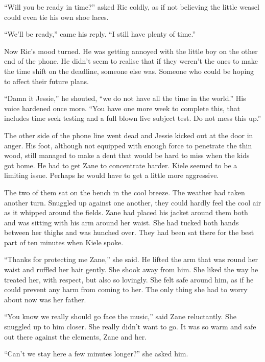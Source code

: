``Will you be ready in time?'' asked Ric coldly, as if not believing the little weasel could even tie his own shoe laces.

``We'll be ready,'' came his reply.  ``I still have plenty of time.''

Now Ric's mood turned.  He was getting annoyed with the little boy on the other end of the phone.  He didn't seem to realise that if they weren't the ones to make the time shift on the deadline, someone else was.  Someone who could be hoping to affect their future plans.  

``Damn it Jessie,'' he shouted, ``we do not have all the time in the world.''  His voice hardened once more.  ``You have one more week to complete this, that includes time seek testing and a full blown live subject test.  Do not mess this up.''

The other side of the phone line went dead and Jessie kicked out at the door in anger.  His foot, although not equipped with enough force to penetrate the thin wood, still managed to make a dent that would be hard to miss when the kids got home.  He had to get Zane to concentrate harder.  Kiele seemed to be a limiting issue.  Perhaps he would have to get a little more aggressive.



\thoughtbreak



The two of them sat on the bench in the cool breeze.  The weather had taken another turn.  Snuggled up against one another, they could hardly feel the cool air as it whipped around the fields.  Zane had placed his jacket around them both and was sitting with his arm around her waist.  She had tucked both hands between her thighs and was hunched over.  They had been sat there for the best part of ten minutes when Kiele spoke.

``Thanks for protecting me Zane,'' she said.  He lifted the arm that was round her waist and ruffled her hair gently.  She shook away from him.  She liked the way he treated her, with respect, but also so lovingly.  She felt safe around him, as if he could prevent any harm from coming to her.  The only thing she had to worry about now was her father.  

``You know we really should go face the music,'' said Zane reluctantly.  She snuggled up to him closer.  She really didn't want to go.  It was so warm and safe out there against the elements, Zane and her.

``Can't we stay here a few minutes longer?'' she asked him.

